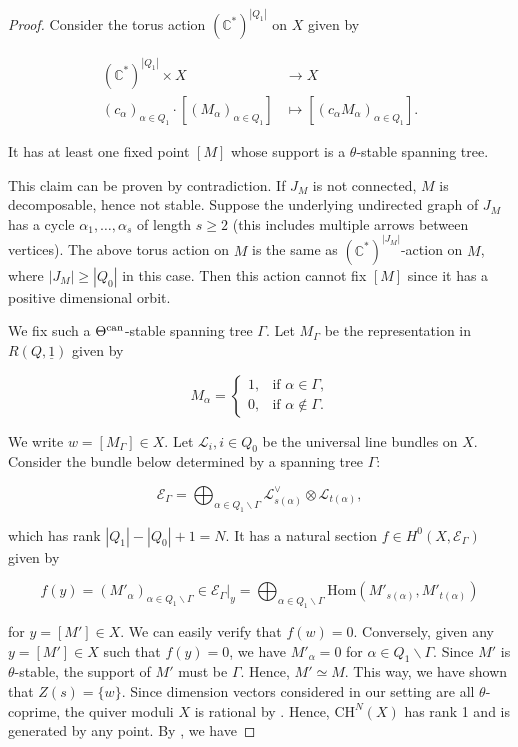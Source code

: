 \documentclass[11pt]{article}
\begin{document}
\begin{proof}
    Consider the torus action \((\mathbb{C}^*)^{|Q_1|}\) on \(X\) given by 

    \begin{align*}
        (\mathbb{C}^*)^{|Q_1|} \times X&\rightarrow X\\ 
        (c_{\alpha})_{\alpha\in Q_1}\cdot [(M_{\alpha})_{\alpha\in Q_1}] &\mapsto [(c_{\alpha}M_{\alpha})_{\alpha\in Q_1}].
    \end{align*}
    
    It has at least one fixed point \([M]\) whose support is a \(\theta\)-stable spanning tree. 

    This claim can be proven by contradiction. If \(J_M\) is not connected, \(M\) is decomposable, hence not stable. Suppose the underlying undirected graph of \(J_M\) has a cycle \(\alpha_1, \dots, \alpha_s\) of length \(s\geq 2\) (this includes multiple arrows between vertices). The above torus action on \(M\) is the same as \((\mathbb{C}^*)^{|J_M|}\)-action on \(M\), where \(|J_M|\geq |Q_0|\) in this case. Then this action cannot fix \([M]\) since it has a positive dimensional orbit. 
    
    We fix such a \(\Theta^{\text{can}}\)-stable spanning tree \(\Gamma\). Let \(M_{\Gamma}\) be the representation in \(R(Q, \underline{1})\) given by

    \[
    M_{\alpha} = \begin{cases}
        1, & \text{if \(\alpha\in \Gamma\),}\\ 
        0, & \text{if \(\alpha\notin \Gamma\).}
    \end{cases}
    \]

    We write \(w = [M_{\Gamma}]\in X\). Let \(\mathcal{L}_i, i\in Q_0\) be the universal line bundles on \(X\). Consider the bundle below determined by a spanning tree \(\Gamma\):

    \[
    \mathcal{E}_{\Gamma} = \bigoplus_{\alpha\in Q_1\backslash\Gamma}\mathcal{L}_{s(\alpha)}^{\vee}\otimes\mathcal{L}_{t(\alpha)},
    \]

    which has rank \(|Q_1| - |Q_0| + 1 = N\). It has a natural section \(f\in H^0(X, \mathcal{E}_{\Gamma})\) given by 

    \[
    f(y) = (M'_{\alpha})_{\alpha\in Q_1\backslash\Gamma}\in \mathcal{E}_{\Gamma}|_y = \bigoplus_{\alpha\in Q_1\backslash \Gamma}\mathrm{Hom}(M'_{s(\alpha)}, M'_{t(\alpha)})
    \]

    for \(y = [M']\in X\). We can easily verify that \(f(w) = 0\). Conversely, given any \(y = [M']\in X\) such that \(f(y) = 0\), we have \(M'_{\alpha} = 0\) for \(\alpha\in Q_1\backslash \Gamma\). Since \(M'\) is \(\theta\)-stable, the support of \(M'\) must be \(\Gamma\). Hence, \(M'\simeq M\). This way, we have shown that \(Z(s) = \{w\}\). Since dimension vectors considered in our setting are all \(\theta\)-coprime, the quiver moduli \(X\) is rational by \cite[Theorem 6.4]{Schofield01}. Hence, \(\mathrm{CH}^N(X)\) has rank 1 and is generated by any point. By \cite[Proposition 14.1 (a)]{Fulton98}, we have 


\end{proof}
\end{document}
